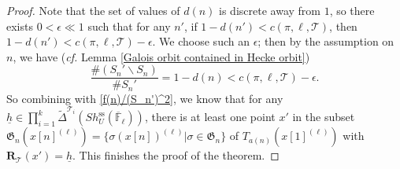 \documentclass[11pt,oneside,reqno]{amsart}
\newcommand{\ssrm}{\mathrm{ss}}
\newcommand{\F}{\mathbb{F}}
\newcommand{\Tcal}{\mathcal{T}}
\newcommand{\Rbf}{\mathbf{R}}
\newcommand{\Gfrak}{\mathfrak{G}}
\theoremstyle{plain}
\begin{document}
\begin{proof}
		
		
		
		Note that the set of values of $d(n)$ is discrete away from $1$, so there exists $0<\epsilon\ll1$ such that for any $n'$, if $1-d(n')<c(\pi,\ell,\Tcal)$, then $1-d(n')<c(\pi,\ell,\Tcal)-\epsilon$. We choose such an $\epsilon$; then by the assumption on $n$, we have (\emph{cf.} Lemma \ref{Galois orbit contained in Hecke orbit})
		\[
		\frac{\#(S_n'\backslash S_n)}{\#S_n'}
		=
		1-d(n)<c(\pi,\ell,\Tcal)-\epsilon.
		\]
		So combining with \ref{f(n)/(S_n')^2}, we know that for any $\underline{h}\in\prod_{i=1}^k\widetilde{\Delta}^{\Tcal_i}(Sh_U^\ssrm(\overline{\F}_\ell))$, there is at least one point $x'$ in the subset $\Gfrak_n(x[n]^{(\ell)})=\{\sigma(x[n])^{(\ell)}|\sigma\in\Gfrak_n\}$ of $T_{a(n)}(x[1]^{(\ell)})$ with $\Rbf_{\Tcal}(x')=\underline{h}$. This finishes the proof of the theorem.
	\end{proof}
	
	
	
\end{document}
